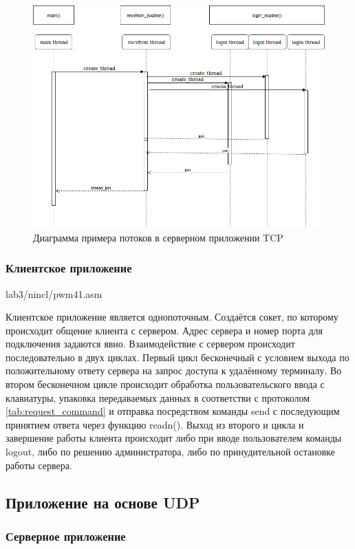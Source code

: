 \begin{figure}[H]
\centering
\includegraphics[width=1\textwidth]{pics/tcpthread.png}
\caption{Диаграмма примера потоков в серверном приложении TCP}
\label{tcp_thr}
\end{figure}

\subsubsection{Клиентское приложение}lab3/nincl/pwm41.asm

Клиентское приложение является однопоточным. Создаётся сокет, по которому происходит общение клиента с сервером. Адрес сервера и номер порта для подключения задаются явно. Взаимодействие с сервером происходит последовательно в двух циклах. Первый цикл бесконечный с условием выхода по положительному ответу сервера на запрос доступа к удалённому терминалу. Во втором бесконечном цикле происходит обработка пользовательского ввода с клавиатуры, упаковка передаваемых данных в соответстви с протоколом \ref{tab:request_command} и отправка посредством команды send с последующим принятием ответа через функцию readn(). Выход из второго и цикла и завершение работы клиента происходит либо при вводе пользователем команды logout, либо по решению администратора, либо по принудительной остановке работы сервера.

\subsection{Приложение на основе UDP}
\subsubsection{Серверное приложение}

